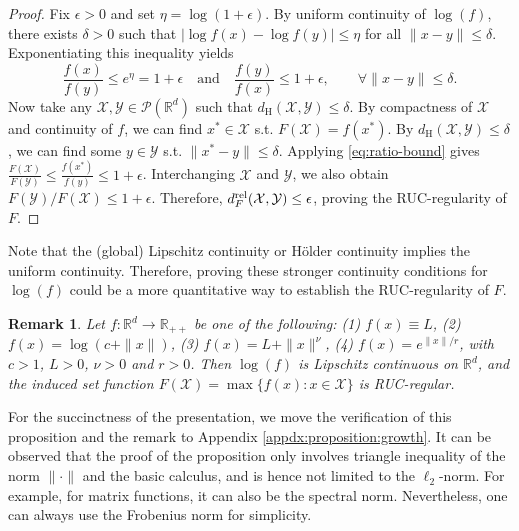 \documentclass{article}
\newtheorem{remark}[theorem]{Remark}
\newcommand{\cX}{\mathcal{X}}
\newcommand{\cY}{\mathcal{Y}}
\begin{document}
\begin{proof}

Fix $\epsilon>0$ and set $\eta=\log(1+\epsilon)$. By uniform continuity of
$\log(f)$, there exists $\delta>0$ such that $|\log f(x)-\log f(y)| \le \eta$ for all $\|x-y\|\le \delta$.  
Exponentiating this inequality yields 
\begin{equation}\label{eq:ratio-bound}
\frac{f(x)}{f(y)} \le e^\eta = 1+\epsilon
\quad\text{and}\quad
\frac{f(y)}{f(x)} \le 1+\epsilon, \qquad \forall \|x-y\|\le\delta.
\end{equation} 
Now take any $\mathcal{X},\mathcal{Y}\in\mathcal{P}(\mathbb{R}^d)$ such that 
$d_{\mathrm{H}}(\mathcal{X},\mathcal{Y})\le \delta$. By compactness of $\mathcal{X}$ and 
continuity of $f$, we can find $x^*\in\mathcal{X}$ s.t.
$F(\mathcal{X})=f(x^{*})$. By $d_{\mathrm{H}}(\mathcal{X},\mathcal{Y})\le \delta$, we can find some $y\in\mathcal{Y}$ s.t. $\|x^{*}-y\|\le\delta$. Applying
\eqref{eq:ratio-bound} gives
$\frac{F(\cX)}{F(\cY)} \leq \frac{f(x^*)}{f(y)} \leq 1+\epsilon$. Interchanging
$\mathcal{X}$ and $\mathcal{Y}$, we also obtain
$F(\mathcal{Y})/F(\mathcal{X})\le 1+\epsilon$. Therefore, $d^{\rm rel}_F(\cX,\cY)\leq \epsilon$, proving the RUC-regularity of $F$.

\end{proof}

Note that the (global) Lipschitz continuity or H\"older continuity implies the uniform continuity. Therefore,  proving these stronger continuity  conditions for $\log(f)$ could be a more quantitative way to establish the RUC-regularity of $F$. 

\begin{remark}
\label{remark:growth}
Let $f:\mathbb{R}^d\to\mathbb{R}_{++}$ be one of the following: \emph{(1)} $f(x) \equiv L$, \emph{(2)} $f(x) = \log(c+\|x\|)$, \emph{(3)} $f(x) = L + \|x\|^\nu$, \emph{(4)} $f(x) = e^{\|x\|/r}$, with $c>1$, $L>0$, $\nu>0$ and $r>0$. Then $\log(f)$ is Lipschitz continuous on $\mathbb{R}^d$, and the induced set function 
$F(\mathcal{X})=\max\{f(x):x\in\mathcal{X}\}$ is RUC-regular.
\end{remark}


\noindent For the succinctness of the presentation, we move the verification of this proposition and the remark to Appendix \ref{appdx:proposition:growth}. It can be observed that the proof of the proposition only involves triangle inequality of the norm $\|\cdot\|$ and the basic calculus, and is hence not limited to the $\ell_2$-norm. For example, for matrix functions, it can also be the spectral norm. Nevertheless, one can always use the Frobenius norm for simplicity. 
\end{document}
